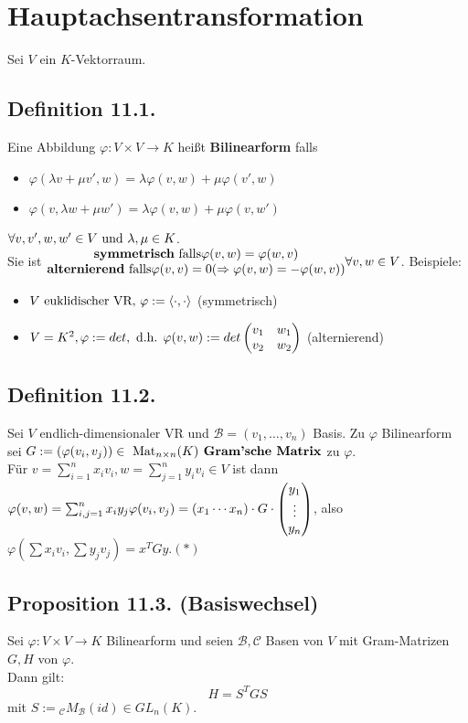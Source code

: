 \documentclass[a4paper, 12pt]{extarticle}
\newcommand{\twoXtwo}[4] {
	\left( 
	\begin{matrix}
		#1 & #2 \\
		#3 & #4
	\end{matrix} 
	\right)
}
\newcommand{\vecThree}[3] {
	\left( 
	\begin{matrix}
		#1\\
		#2\\
		#3
	\end{matrix} 
	\right)
}
\newcommand{\skalar}[2] {
	\langle #1, #2\rangle
}
\newcommand{\genskalar}{
	\skalar{\cdot }{\cdot }
}
\newcommand{\tn}[1]{\textnormal {#1}}
\begin{document}
\section{Hauptachsentransformation}
Sei $V$ ein $K$-Vektorraum.
\subsection*{Definition 11.1.}
Eine Abbildung $\varphi :V\times V \longrightarrow K$ heißt \textbf{Bilinearform} falls
\begin{itemize}
	\item $\varphi(\lambda v + \mu v', w) = \lambda \varphi(v, w) + \mu \varphi(v', w)$
	\item $\varphi(v, \lambda w + \mu w') = \lambda \varphi(v, w) + \mu \varphi(v, w')$
\end{itemize}
$\forall v, v', w, w' \in V \tn{ und } \lambda, \mu \in K$.\\
Sie ist $\begin{matrix}\tn{\textbf{symmetrisch} falls} \varphi(v, w) = \varphi(w, v)\\
	\tn{\textbf{alternierend} falls} \varphi(v, v) = 0 (\Rightarrow \varphi(v, w) = -\varphi(w, v))
\end{matrix} \forall v, w \in V$.\newpage
Beispiele:
\begin{itemize}
	\item $V \tn{ euklidischer VR, } \varphi := \genskalar$ (symmetrisch)
	\item $V = K^2, \varphi := det, \tn{ d.h. } \varphi (v, w) := det \twoXtwo{v_1}{w_1}{v_2}{w_2}$ (alternierend)
\end{itemize}
\subsection*{Definition 11.2.}
Sei $V$ endlich-dimensionaler VR und $\mathcal{B} = (v_1, \dots, v_n)$ Basis. Zu $\varphi$ Bilinearform sei $G := (\varphi(v_i, v_j)) \in \tn{ Mat}_{n \times n}(K) \tn{\textbf{ Gram'sche Matrix}}$ zu $\varphi$.\\
Für $v = \sum_{i=1}^{n}x_iv_i, w = \sum_{j=1}^{n}y_iv_i \in V$ ist dann $\varphi(v, w) = \sum_{i, j = 1}^{n}x_iy_j\varphi(v_i, v_j) =\\ (x_1 \cdots x_n) \cdot G \cdot \vecThree{y_1}{\vdots}{y_n}$, also $\varphi(\sum x_iv_i, \sum y_jv_j) = x^TGy. (\ast)$
\subsection*{Proposition 11.3. (Basiswechsel)}
Sei $\varphi : V\times V \longrightarrow K$ Bilinearform und seien $\mathcal{B}, \mathcal{C}$ Basen von $V$ mit Gram-Matrizen $G, H$ von $\varphi$.\\
Dann gilt:
$$H = S^TGS$$ mit $S := {_\mathcal{C}}M_{\mathcal{B}}(id) \in GL_n(K).$
\end{document}
